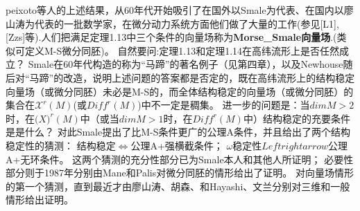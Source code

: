   \begin{corollary}
    peixoto等人的上述结果，从60年代开始吸引了在国外以Smale为代表、在国内以廖山涛为代表的一批数学家，在微分动力系统方面他们做了大量的工作(参见[L1],[Zzs]等).人们把满足定理1.13中三个条件的向量场称为\textbf{Morse_Smale向量场}.(类似可定义M-S微分同胚)。
    自然要问:定理1.13和定理1.14在高纬流形上是否任然成立？
    Smale在60年代构造的称为“马蹄”的著名例子（见第四章），以及Newhouse随后对“马蹄”的改造，说明上述问题的答案都是否定的，既在高纬流形上的结构稳定向量场（或微分同胚）未必是M-S的，而全体结构稳定的向量场（或微分同胚）的集合在\(\mathscr{X}^r(M)\)(或\(Diff^r(M)\))中不一定是稠集。
    进一步的问题是：当\(dimM>2\)时，在\(\mathscr(X)^r(M)\)中（或当\(dimM>1\)时，在\(Diff^r(M)\)中）结构稳定的充要条件是是什么？
    对此Smale提出了比M-S条件更广的公理A条件，并且给出了两个结构稳定性的猜测：
    结构稳定\(\Leftrightarrow\)公理A+强横截条件；
    \(\omega\)稳定性\(Leftrightarrow\)公理A+无环条件。
    这两个猜测的充分性部分已为Smale本人和其他人所证明；
    必要性部分则于1987年分别由Mane和Palis对微分同胚的情形给出了证明。
    对向量场情形的第一个猜测，直到最近才由廖山涛、胡森、和Hayashi、文兰分别对三维和一般情形给出证明。
  \end{corollary}
